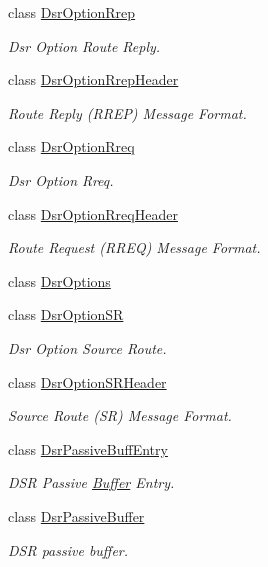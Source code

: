 \begin{DoxyCompactItemize}
class \hyperlink{classns3_1_1dsr_1_1DsrOptionRrep}{Dsr\+Option\+Rrep}
\begin{DoxyCompactList}\small\item\em Dsr Option Route Reply. \end{DoxyCompactList}\item 
class \hyperlink{classns3_1_1dsr_1_1DsrOptionRrepHeader}{Dsr\+Option\+Rrep\+Header}
\begin{DoxyCompactList}\small\item\em Route Reply (R\+R\+EP) Message Format. \end{DoxyCompactList}\item 
class \hyperlink{classns3_1_1dsr_1_1DsrOptionRreq}{Dsr\+Option\+Rreq}
\begin{DoxyCompactList}\small\item\em Dsr Option Rreq. \end{DoxyCompactList}\item 
class \hyperlink{classns3_1_1dsr_1_1DsrOptionRreqHeader}{Dsr\+Option\+Rreq\+Header}
\begin{DoxyCompactList}\small\item\em Route Request (R\+R\+EQ) Message Format. \end{DoxyCompactList}\item 
class \hyperlink{classns3_1_1dsr_1_1DsrOptions}{Dsr\+Options}
\item 
class \hyperlink{classns3_1_1dsr_1_1DsrOptionSR}{Dsr\+Option\+SR}
\begin{DoxyCompactList}\small\item\em Dsr Option Source Route. \end{DoxyCompactList}\item 
class \hyperlink{classns3_1_1dsr_1_1DsrOptionSRHeader}{Dsr\+Option\+S\+R\+Header}
\begin{DoxyCompactList}\small\item\em Source Route (SR) Message Format. \end{DoxyCompactList}\item 
class \hyperlink{classns3_1_1dsr_1_1DsrPassiveBuffEntry}{Dsr\+Passive\+Buff\+Entry}
\begin{DoxyCompactList}\small\item\em D\+SR Passive \hyperlink{classns3_1_1Buffer}{Buffer} Entry. \end{DoxyCompactList}\item 
class \hyperlink{classns3_1_1dsr_1_1DsrPassiveBuffer}{Dsr\+Passive\+Buffer}
\begin{DoxyCompactList}\small\item\em D\+SR passive buffer. \end{DoxyCompactList}\item 

\end{DoxyCompactItemize}
